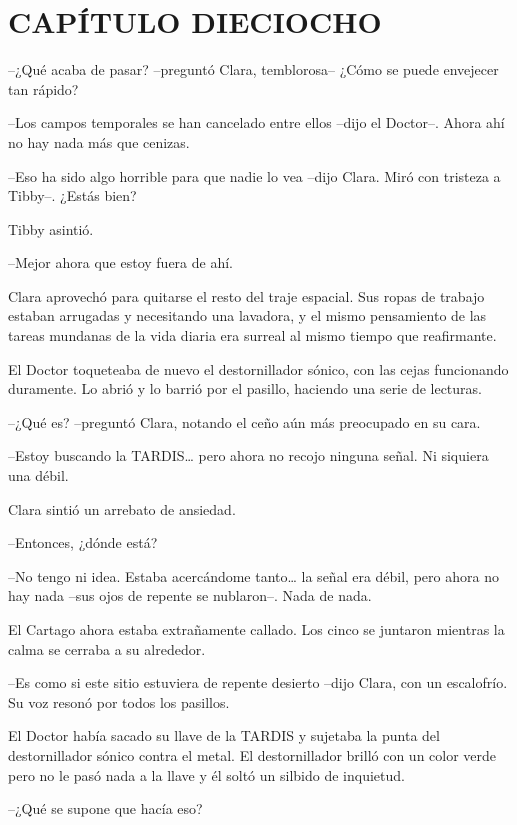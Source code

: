 \chapter*{CAPÍTULO DIECIOCHO}

{--¿Qué acaba de pasar? --preguntó Clara, temblorosa-- ¿Cómo se puede
envejecer tan rápido?}

{--Los campos temporales se han cancelado entre ellos --dijo el Doctor--.
Ahora ahí no hay nada más que cenizas.}

{--Eso ha sido algo horrible para que nadie lo vea --dijo Clara. Miró con
tristeza a Tibby--. ¿Estás bien?}

{Tibby asintió.}

{--Mejor ahora que estoy fuera de ahí.}

{Clara aprovechó para quitarse el resto del traje espacial. Sus ropas de
 trabajo estaban arrugadas y necesitando una lavadora, y el mismo
 pensamiento de las tareas mundanas de la vida diaria era surreal al
mismo tiempo que reafirmante.}

{El Doctor toqueteaba de nuevo el destornillador sónico, con las cejas
 funcionando duramente. Lo abrió y lo barrió por el pasillo, haciendo una
serie de lecturas.}

{--¿Qué es? --preguntó Clara, notando el ceño aún más preocupado en su
cara.}

{--Estoy buscando la TARDIS\ldots{} pero ahora no recojo ninguna señal.
Ni siquiera una débil.}

{Clara sintió un arrebato de ansiedad.}

{--Entonces, ¿dónde está?}

{--No tengo ni idea. Estaba acercándome tanto\ldots{} la señal era débil,
 pero ahora no hay nada --sus ojos de repente se nublaron--. Nada de
nada.}

{El Cartago ahora estaba extrañamente callado. Los cinco se juntaron
mientras la calma se cerraba a su alrededor.}

{--Es como si este sitio estuviera de repente desierto --dijo Clara, con
un escalofrío. Su voz resonó por todos los pasillos.}

{El Doctor había sacado su llave de la TARDIS y sujetaba la punta del
 destornillador sónico contra el metal. El destornillador brilló con un
 color verde pero no le pasó nada a la llave y él soltó un silbido de
inquietud.}

{--¿Qué se supone que hacía eso?}

